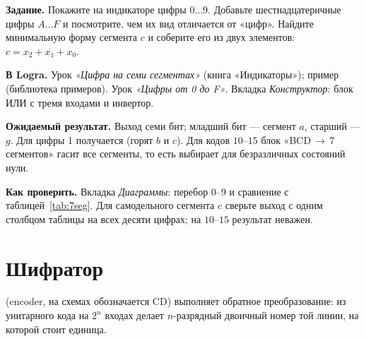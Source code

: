 \begin{diybox}
\textbf{Задание.}  Покажите на индикаторе цифры $0\ldots9$.
 Добавьте шестнадцатеричные цифры $A\ldots F$ и посмотрите,
чем их вид отличается от «цифр».  Найдите минимальную форму
сегмента $c$ и соберите его из двух элементов: $c=x_2+\overline{x_1}+x_0$.

\textbf{В Logra.}  Урок \emph{«Цифра на семи сегментах»} (книга
«Индикаторы»); пример  (библиотека примеров).
 Урок \emph{«Цифры от 0 до F»}.  Вкладка
\emph{Конструктор}: блок ИЛИ с тремя входами и инвертор.

\textbf{Ожидаемый результат.} Выход семи бит; младший бит --- сегмент
$a$, старший --- $g$. Для цифры 1 получается  (горят $b$ и $c$).
Для кодов $10$--$15$ блок «BCD\,$\to$\,7 сегментов» гасит все
сегменты, то есть выбирает для безразличных состояний нули.

\textbf{Как проверить.} Вкладка \emph{Диаграммы}: перебор $0$--$9$
и сравнение с таблицей~\ref{tab:7seg}. Для самодельного сегмента
$c$ сверьте выход с одним столбцом таблицы на всех десяти цифрах; на
$10$--$15$ результат неважен.
\end{diybox}

\section{Шифратор}

 (encoder, на схемах обозначается CD) выполняет обратное
преобразование: из унитарного кода на $2^n$ входах делает $n$-разрядный
двоичный номер той линии, на которой стоит единица.


